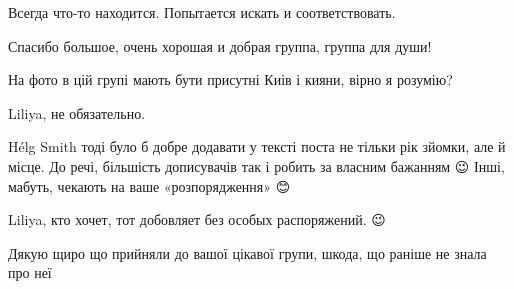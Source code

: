 \begin{itemize}
Всегда что-то находится. Попытается искать и соответствовать.


Спасибо большое, очень хорошая и добрая группа, группа для души!


На фото в цій групі мають бути присутні Киів і кияни, вірно я розумію?


Liliya, не обязательно.

Hélg Smith тоді було б добре додавати у тексті поста не тільки рік зйомки, але
й місце. До речі, більшість дописувачів так і робить за власним бажанням 😉
Інші, мабуть, чекають на ваше «розпорядження» 😊


Liliya, кто хочет, тот добовляет без особых распоряжений. 😉


Дякую щиро що прийняли до вашої цікавої групи, шкода, що раніше не знала про неї
\end{itemize}
